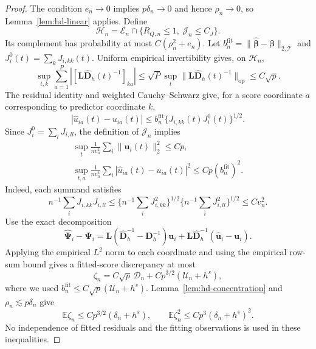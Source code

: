 \documentclass[10pt]{book}
\newcommand{\bu}{{\mathbf u}}
\newcommand{\bD}{{\mathbf D}}
\newcommand{\bL}{{\mathbf L}}
\newcommand{\bbeta}  {\boldsymbol{\beta}}
\newcommand{\bPsi} {\boldsymbol{\Psi}}
\newcommand{\expect}{\mathbb{E}}
\numberwithin{equation}{section}
\begin{document}
\begin{proof}
The condition $e_n\to0$ implies $p\delta_n\to0$ and hence
$\rho_n\to0$, so
Lemma~\ref{lem:hd-linear} applies.  Define
\[
\mathcal H_n=\mathcal E_n\cap\{R_{Q,n}\le1,
\ \mathcal J_n\le C_J\}.
\]
Its complement has probability at most $C(\rho_n^2+e_n)$.
Let $b_n^{\mathrm{fit}}=
\|\widehat{\bbeta}-\bbeta\|_{2,\mathcal T}$ and
$J_i^0(t)=\sum_kJ_{i,kk}(t)$.
Uniform empirical invertibility gives, on $\mathcal H_n$,
\[
\sup_{t,k}\sum_{a=1}^P|[\bL\widehat{\bD}_h(t)^{-1}]_{ka}|
\le\sqrt P\sup_t\|\bL\widehat{\bD}_h(t)^{-1}\|_{\mathrm{op}}
\le C\sqrt p.
\]
The residual identity and weighted Cauchy--Schwarz give, for a score
coordinate $a$ corresponding to predictor coordinate $k$,
\[
|\widehat u_{ia}(t)-u_{ia}(t)|
\le b_n^{\mathrm{fit}}\{J_{i,kk}(t)J_i^0(t)\}^{1/2}.
\]
Since $J_i^0=\sum_lJ_{i,ll}$, the definition of $\mathcal J_n$ implies
\[
\begin{gathered}
\sup_t\frac1{nv_n^2}\sum_i\|\bu_i(t)\|_2^2\le Cp,\\
\sup_{t,a}\frac1{nv_n^2}\sum_i
|\widehat u_{ia}(t)-u_{ia}(t)|^2
\le Cp(b_n^{\mathrm{fit}})^2.
\end{gathered}
\]
Indeed, each summand satisfies
\[
n^{-1}\sum_iJ_{i,kk}J_{i,ll}
\le \{n^{-1}\sum_iJ_{i,kk}^2\}^{1/2}
\{n^{-1}\sum_iJ_{i,ll}^2\}^{1/2}\le Cv_n^2.
\]
Use the exact decomposition
\[
\widehat{\bPsi}_i-\bPsi_i
=\bL(\widehat{\bD}_h^{-1}-\bD_h^{-1})\bu_i
+\bL\widehat{\bD}_h^{-1}(\widehat\bu_i-\bu_i).
\]
Applying the empirical $L^2$ norm to each coordinate and using
the empirical row-sum bound gives a fitted-score discrepancy at most
\[
\zeta_n=C\sqrt p\,\mathcal D_n
+Cp^{3/2}(\mathcal U_n+h^s),
\]
where we used $b_n^{\mathrm{fit}}\le C\sqrt p(\mathcal U_n+h^s)$.
Lemma~\ref{lem:hd-concentration} and $\rho_n\lesssim p\delta_n$ give
\[
\expect\zeta_n\le Cp^{3/2}(\delta_n+h^s),\qquad
\expect\zeta_n^2\le Cp^3(\delta_n+h^s)^2.
\]
No independence of fitted residuals and the fitting observations is
used in these inequalities.


\end{proof}
\end{document}
